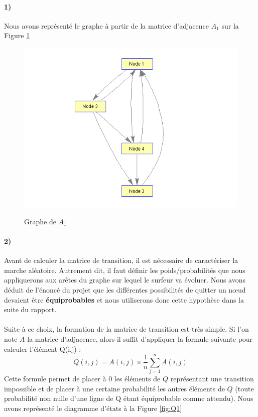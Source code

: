 \documentclass[a4paper,titlepage]{report}
\begin{document}
\paragraph{1)} Nous avons représenté le graphe à partir de la matrice d'adjacence $A_1$ sur la Figure \ref{fig:a1_graph}
\begin{figure}[h]
	\center
	\includegraphics[scale=0.45]{../images/a1_graph.png}\label{fig:a1_graph}
	\caption{Graphe de $A_1$}
\end{figure}
\paragraph{2)} Avant de calculer la matrice de transition, il est nécessaire de caractériser la marche aléatoire. Autrement dit, il faut définir les poids/probabilités que nous appliquerons aux arêtes du graphe sur lequel le surfeur va évoluer. Nous avons déduit de l'énoncé du projet que les différentes possibilités de quitter un nœud devaient être \textbf{équiprobables} et nous utiliserons donc cette hypothèse dans la suite du rapport.
\paragraph{}
Suite à ce choix, la formation de la matrice de transition est très simple. Si l'on note $A$ la matrice d'adjacence, alors il suffit d'appliquer la formule suivante pour calculer l'élément Q(i,j) :
\[
Q(i,j) = A(i,j) \times \frac{1}{n}\sum\limits_{j = 1}^n A(i,j)
\]
Cette formule permet de placer à $0$ les éléments de $Q$ représentant une transition impossible et de placer à une certaine probabilité les autres éléments de $Q$ (toute probabilité non nulle d'une ligne de Q étant équiprobable comme attendu). Nous avons représenté le diagramme d'états à la Figure \ref{fig:Q1}
\end{document}
